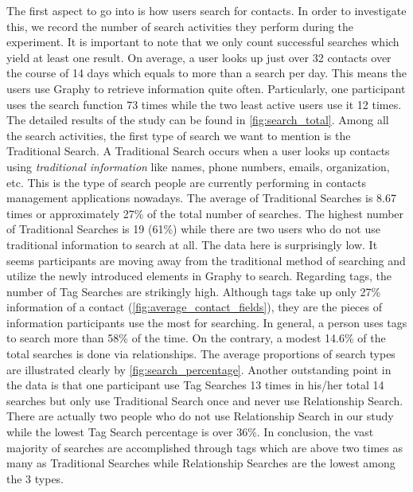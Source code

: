 The first aspect to go into is how users search for contacts. In order to investigate this, we record the number of search activities they perform during the experiment. It is important to note that we only count successful searches which yield at least one result. On average, a user looks up just over 32 contacts over the course of 14 days which equals to more than a search per day. This means the users use Graphy to retrieve information quite often. Particularly, one participant uses the search function 73 times while the two least active users use it 12 times. The detailed results of the study can be found in \autoref{fig:search_total}. Among all the search activities, the first type of search we want to mention is the Traditional Search. A Traditional Search occurs when a user looks up contacts using \textit{traditional information} like names, phone numbers, emails, organization, etc. This is the type of search people are currently performing in contacts management applications nowadays. The average of Traditional Searches is 8.67 times or approximately 27\% of the total number of searches. The highest number of Traditional Searches is 19 (61\%) while there are two users who do not use traditional information to search at all. The data here is surprisingly low. It seems participants are moving away from the traditional method of searching and utilize the newly introduced elements in Graphy to search. Regarding tags, the number of Tag Searches are strikingly high. Although tags take up only 27\% information of a contact (\autoref{fig:average_contact_fields}), they are the pieces of information participants use the most for searching. In general, a person uses tags to search more than 58\% of the time. On the contrary, a modest 14.6\% of the total searches is done via relationships. The average proportions of search types are illustrated clearly by \autoref{fig:search_percentage}. Another outstanding point in the data is that one participant use Tag Searches 13 times in his/her total 14 searches but only use Traditional Search once and never use Relationship Search. There are actually two people who do not use Relationship Search in our study while the lowest Tag Search percentage is over 36\%. In conclusion, the vast majority of searches are accomplished through tags which are above two times as many as Traditional Searches while Relationship Searches are the lowest among the 3 types.

